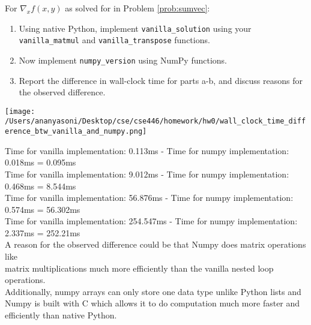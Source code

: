 \documentclass{article}
\begin{document}
\begin{aprob} \label{prob:sumvecimp}
    For $\nabla_x f(x,y)$ as solved for in Problem \ref{prob:sumvec}:
    \begin{enumerate}
        \item {} \sloppy Using native Python, implement \verb|vanilla_solution| using your \verb|vanilla_matmul| and \verb|vanilla_transpose| functions.
        \item {} Now implement \verb|numpy_version| using NumPy functions.
        \item {} Report the difference in wall-clock time for parts a-b, and discuss reasons for the observed difference.
    \end{enumerate}
    \begin{tcolorbox}[colback=lightgray!10!white, colframe=black, title=A9]
    \begin{center}
        \texttt{[image: /Users/ananyasoni/Desktop/cse/cse446/homework/hw0/wall\_clock\_time\_difference\_btw\_vanilla\_and\_numpy.png]}
    \end{center}
    Time for vanilla implementation: 0.113ms - Time for numpy implementation: 0.018ms = 0.095ms \\
    Time for vanilla implementation: 9.012ms - Time for numpy implementation: 0.468ms = 8.544ms \\
    Time for vanilla implementation: 56.876ms - Time for numpy implementation: 0.574ms = 56.302ms \\
    Time for vanilla implementation: 254.547ms - Time for numpy implementation: 2.337ms = 252.21ms \\

    A reason for the observed difference could be that Numpy does matrix operations like \\
    matrix multiplications much more efficiently than the vanilla nested loop operations. \\
    Additionally, numpy arrays can only store one data type unlike Python lists and Numpy is built with
    C which allows it to do computation much more faster and efficiently than native Python.
    \end{tcolorbox}
\end{aprob}
\end{document}
